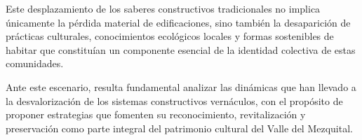 Este desplazamiento de los saberes constructivos tradicionales no implica únicamente la pérdida material de edificaciones, sino también la desaparición de prácticas culturales, conocimientos ecológicos locales y formas sostenibles de habitar que constituían un componente esencial de la identidad colectiva de estas comunidades.

Ante este escenario, resulta fundamental analizar las dinámicas que han llevado a la desvalorización de los sistemas constructivos vernáculos, con el propósito de proponer estrategias que fomenten su reconocimiento, revitalización y preservación como parte integral del patrimonio cultural del Valle del Mezquital.
